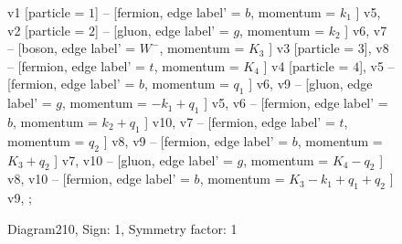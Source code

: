 \documentclass{revtex4}
\begin{document}
\begin{figure}[!htb]
\begin{center}
{    %
v1 [particle = \(1\)] -- [fermion, edge label' = \(b\), momentum = \(k_{1}\) ] v5, 
v2 [particle = \(2\)] -- [gluon, edge label' = \(g\), momentum = \(k_{2}\) ] v6, 
v7 -- [boson, edge label' = \(W^{-}\), momentum = \(K_{3}\) ] v3 [particle = \(3\)], 
v8 -- [fermion, edge label' = \(t\), momentum = \(K_{4}\) ] v4 [particle = \(4\)], 
v5 -- [fermion, edge label' = \(b\), momentum = \(q_{1}\) ] v6, 
v9 -- [gluon, edge label' = \(g\), momentum = \(-k_{1} + q_{1}\) ] v5, 
v6 -- [fermion, edge label' = \(b\), momentum = \(k_{2} + q_{1}\) ] v10, 
v7 -- [fermion, edge label' = \(t\), momentum = \(q_{2}\) ] v8, 
v9 -- [fermion, edge label' = \(b\), momentum = \(K_{3} + q_{2}\) ] v7, 
v10 -- [gluon, edge label' = \(g\), momentum = \(K_{4} - q_{2}\) ] v8, 
v10 -- [fermion, edge label' = \(b\), momentum = \(K_{3} - k_{1} + q_{1} + q_{2}\) ] v9, 
};
\end{center}
\caption{Diagram210, Sign: 1, Symmetry factor: 1}
\end{figure}
\newpage
\end{document}
